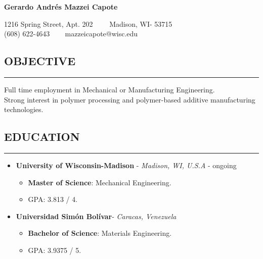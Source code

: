 \documentclass[11pt,letterpaper]{article}
\newenvironment{indentsection}[1]%
{\begin{list}{}%
	{\setlength{\leftmargin}{#1}}%
	\item[]%
}
{\end{list}}
\begin{document}
	\thispagestyle{firststyle}
	
\begin{center}
	{\LARGE \textbf{Gerardo Andrés Mazzei Capote}}

	1216 Spring Street, Apt. 202\ \ \textbullet
	\ \ Madison, WI- 53715
	\\
	(608) 622-4643 \ \textbullet
	\ \ mazzeicapote@wisc.edu
\end{center}

\vspace{-1em}

\subsection*{OBJECTIVE}
	\vspace{-0.5em}
	\hrule
	\vspace{0.4em}
	\begin{indentsection}{\parindent}
		Full time employment in Mechanical or Manufacturing Engineering.\\
		Strong interest in polymer processing and polymer-based additive manufacturing technologies.
	\end{indentsection}


\subsection*{EDUCATION}
	\vspace{-0.5em}
	\hrule
	\vspace{0.4em}
	\begin{itemize}
	\item
	\textbf{University of Wisconsin-Madison} - \emph{Madison, WI, U.S.A} - ongoing
	\begin{itemize}	
	\item
	\textbf{Master of Science}: Mechanical Engineering. 
	\item
	GPA: 3.813 / 4.
\end{itemize}

	\item
	\textbf{Universidad Simón Bolívar}- \emph{Caracas, Venezuela}
	\begin{itemize}	
		\item
		\textbf{Bachelor of Science}: Materials Engineering. 
		\item
		GPA: 3.9375 / 5.
	\end{itemize}
	\end{itemize}
\end{document}
